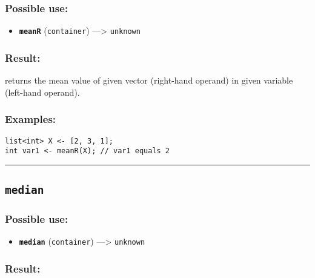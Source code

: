\documentclass[]{book}
\providecommand{\tightlist}{%
  \setlength{\itemsep}{0pt}\setlength{\parskip}{0pt}}
\theoremstyle{definition}
\theoremstyle{definition}
\theoremstyle{definition}
\theoremstyle{remark}
\begin{document}
\subsubsection{Possible use:}\label{possible-use-346}

\begin{itemize}
\tightlist
\item
  \textbf{\texttt{meanR}} (\texttt{container}) ---\textgreater{}
  \texttt{unknown}
\end{itemize}

\subsubsection{Result:}\label{result-335}

returns the mean value of given vector (right-hand operand) in given
variable (left-hand operand).

\subsubsection{Examples:}\label{examples-239}

\begin{verbatim}
list<int> X <- [2, 3, 1];  
int var1 <- meanR(X); // var1 equals 2
\end{verbatim}

\begin{center}\rule{0.5\linewidth}{\linethickness}\end{center}

\subsection{\texorpdfstring{\texttt{median}}{median}}\label{median}

\subsubsection{Possible use:}\label{possible-use-347}

\begin{itemize}
\tightlist
\item
  \textbf{\texttt{median}} (\texttt{container}) ---\textgreater{}
  \texttt{unknown}
\end{itemize}

\subsubsection{Result:}\label{result-336}
\end{document}
